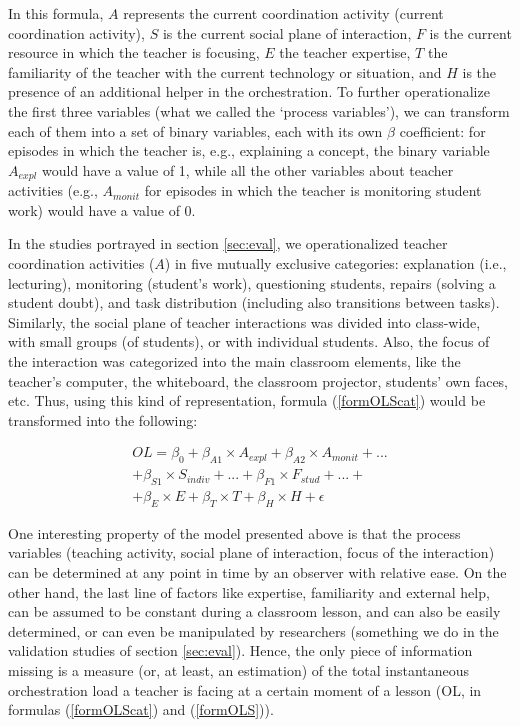 \documentclass[10pt,journal,compsoc]{IEEEtran}
\begin{document}
In this formula, $A$ represents the current coordination activity (current coordination activity), $S$ is the current social plane of interaction, $F$ is the current resource in which the teacher is focusing, $E$ the teacher expertise, $T$ the familiarity of the teacher with the current technology or situation, and $H$ is the presence of an additional helper in the orchestration. To further operationalize the first three variables (what we called the `process variables'), we can transform each of them into a set of binary variables, each with its own $\beta$ coefficient: for episodes in which the teacher is, e.g., explaining a concept, the binary variable $A_{expl}$ would have a value of 1, while all the other variables about teacher activities (e.g., $A_{monit}$ for episodes in which the teacher is monitoring student work) would have a value of 0. 

In the studies portrayed in section \ref{sec:eval}, we operationalized teacher coordination activities ($A$) in five mutually exclusive categories: explanation (i.e., lecturing), monitoring (student's work), questioning students, repairs (solving a student doubt), and task  distribution (including also transitions between tasks). Similarly, the social plane of teacher interactions was divided into class-wide, with small groups (of students), or with individual students. Also, the focus of the interaction was categorized into the main classroom elements, like the teacher's computer, the whiteboard, the classroom projector, students' own faces, etc. Thus, using this kind of representation, formula (\ref{formOLScat}) would be transformed into the following:

\begin{multline}
\label{formOLS}
OL = \beta_0 + \beta_{A1}\times{}A_{expl} + \beta_{A2}\times{}A_{monit} + ... \\ + \beta_{S1}\times{}S_{indiv} + ... + \beta_{F1}\times{}F_{stud} + ... + \\ + \beta_E\times{}E + \beta_T\times{}T + \beta_H\times{}H + \epsilon
\end{multline}

One interesting property of the model presented above is that the process variables (teaching activity, social plane of interaction, focus of the interaction) can be determined at any point in time by an observer with relative ease. On the other hand, the last line of factors like expertise, familiarity and external help, can be assumed to be constant during a classroom lesson, and can also be easily determined, or can even be manipulated by researchers (something we do in the validation studies of section \ref{sec:eval}). Hence, the only piece of information missing is a measure (or, at least, an estimation) of the total instantaneous orchestration load a teacher is facing at a certain moment of a lesson (OL, in formulas (\ref{formOLScat}) and (\ref{formOLS})).
\end{document}

